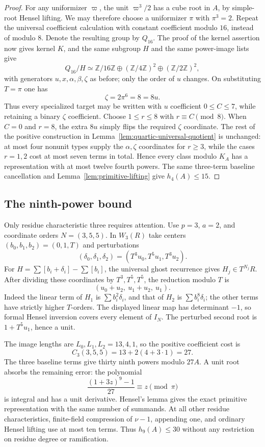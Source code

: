 \documentclass[11pt]{amsart}
\theoremstyle{definition}
\numberwithin{equation}{section}
\begin{document}
\begin{proof}
For any uniformizer $\varpi$, the unit $\varpi^3/2$ has a cube root
in $A$, by simple-root Hensel lifting.  We may therefore choose a
uniformizer $\pi$ with $\pi^3=2$.
Repeat the universal coefficient calculation with constant coefficient
modulo $16$, instead of modulo $8$.  Denote the resulting group by
$Q_{16}$.  The proof of the kernel assertion now gives kernel $K$,
and the same subgroup $H$ and the same power-image lists give
\[
 Q_{16}/H\simeq\mathbb Z/16\mathbb Z\oplus
 (\mathbb Z/4\mathbb Z)^2\oplus(\mathbb Z/2\mathbb Z)^2,
\]
with generators $u,x,\alpha,\beta,\zeta$ as before; only the order
of $u$ changes.  On substituting $T=\pi$ one has
\[
 \zeta=2\pi^6=8=8u.
\]
Thus every specialized target may be written with $u$ coefficient
$0\le C\le7$, while retaining a binary $\zeta$ coefficient.
Choose $1\le r\le8$ with $r\equiv C\pmod8$.  When $C=0$ and
$r=8$, the extra $8u$ simply flips the required $\zeta$ coordinate.
The rest of the positive construction in
Lemma~\ref{lem:quartic-universal-quotient} is unchanged: at most
four nonunit types supply the $\alpha,\zeta$ coordinates for
$r\ge3$, while the cases $r=1,2$ cost at most seven terms in total.
Hence every class modulo $K_A$ has a representation with at most
twelve fourth powers.  The same three-term baseline cancellation
and Lemma~\ref{lem:primitive-lifting} give $h_4(A)\le15$.
\end{proof}

\subsection{The ninth-power bound}
\label{sec:higher-ninth-local}

Only residue characteristic three requires attention. Use $p=3$,
$a=2$, and coordinate orders $N=(3,5,5)$. In $W_3(R)$ take centers
$(b_0,b_1,b_2)=(0,1,T)$ and perturbations
\[
 (\delta_0,\delta_1,\delta_2)
       =(T^3u_0,T^5u_1,T^3u_2).
\]
For $H=\sum[b_i+\delta_i]-\sum[b_i]$, the universal ghost
recurrence gives $H_j\in T^{N_j}R$. After dividing these coordinates
by $T^3,T^5,T^5$, the reduction modulo $T$ is
\[
 (u_0+u_2,\ u_1+u_2,\ u_1).
\]
Indeed the linear term of $H_1$ is $\sum b_i^2\delta_i$, and that
of $H_2$ is $\sum b_i^8\delta_i$; the other terms have strictly
higher $T$-orders. The displayed linear map has determinant $-1$,
so formal Hensel inversion covers every element of $I_N$.
The perturbed second root is $1+T^5u_1$, hence a unit.

The image lengths are $L_0,L_1,L_2=13,4,1$, so the positive
coefficient cost is
\[
 C_3(3,5,5)=13+2(4+3\cdot1)=27.
\]
The three baseline terms give thirty ninth powers modulo $27A$.
A unit root absorbs the remaining error: the polynomial
\[
 \frac{(1+3z)^9-1}{27}\equiv z\pmod\pi
\]
is integral and has a unit derivative. Hensel's lemma gives the
exact primitive representation with the same number of summands.
At all other residue characteristics, finite-field compression of
$\nu-1$, appending one, and ordinary Hensel lifting use at most ten
terms. Thus $h_9(A)\le30$ without any restriction on residue degree
or ramification.
\end{document}
